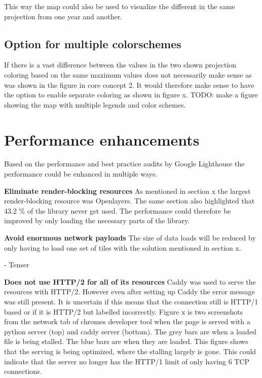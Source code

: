 This way the map could also be used to visualize the different in the same projection from one year and another.
\subsection{Option for multiple colorschemes}
If there is a vast difference between the values in the two shown projection coloring based on the same maximum values does not necessarily make sense as was shown in the figure in core concept 2. It would therefore make sense to have the option to enable separate coloring as shown in figure x. 
TODO: make a figure showing the map with multiple legends and color schemes. 


\section{Performance enhancements}

Based on the performance and best practice audits by Google Lighthouse the performance could be enhanced in multiple ways. 

\textbf{Eliminate render-blocking resources}
As mentioned in section x the largest render-blocking resource was Openlayers. The same section also highlighted that 43.2 \% of the library never get used. The performance could therefore be improved by only loading the necessary parts of the library. 
\citep{OlModule}

\textbf{Avoid enormous network payloads}
The size of data loads will be reduced by only having to load one set of tiles with the solution mentioned in section x. 

-	Tenser 


\textbf{Does not use HTTP/2 for all of its resources}
Caddy was used to serve the resources with HTTP/2. However even after setting up Caddy the error message was still present. It is uncertain if this means that the connection still is HTTP/1 based or if it is HTTP/2 but labelled incorrectly. Figure x is two screenshots from the network tab of chromes developer tool when the page is served with a python server (top) and caddy server (bottom). 
The grey bars are when a loaded file is being stalled. The blue bars are when they are loaded. This figure shows that the serving is being optimized, where the stalling largely is gone. This could indicate that the server no longer has the HTTP/1 limit of only having 6 TCP connections.

